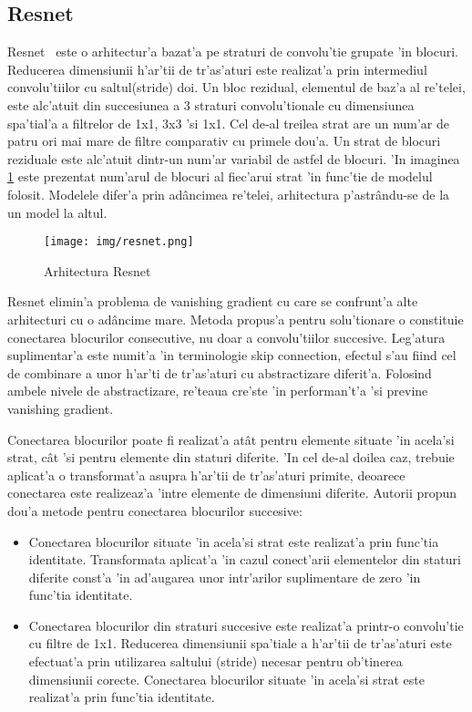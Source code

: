 \documentclass[12pt,a4paper,twoside]{report}
\begin{document}
\subsection{Resnet}

Resnet~\cite{Resnet} este o arhitectur'a bazat'a pe straturi de convolu'tie grupate 'in blocuri. Reducerea dimensiunii h'ar'tii de tr'as'aturi este realizat'a prin intermediul convolu'tiilor cu saltul(stride) doi. Un bloc rezidual, elementul de baz'a al re'telei, este alc'atuit din succesiunea a 3 straturi convolu'tionale cu dimensiunea spa'tial'a a filtrelor de 1x1, 3x3 'si 1x1. Cel de-al treilea strat are un num'ar de patru ori mai mare de filtre comparativ cu primele dou'a. Un strat de blocuri reziduale este alc'atuit dintr-un num'ar variabil de astfel de blocuri. 'In imaginea \ref{fig:resnet} este prezentat num'arul de blocuri al fiec'arui strat 'in func'tie de modelul folosit. Modelele difer'a prin ad\^ancimea re'telei, arhitectura p'astr\^andu-se de la un model la altul.

\begin{figure}[H]
  \texttt{[image: img/resnet.png]}
  \centering
  \caption{Arhitectura Resnet\protect\footnotemark}
  \label{fig:resnet}
\end{figure}

Resnet elimin'a problema de vanishing gradient cu care se confrunt'a alte arhitecturi cu o ad\^ancime mare. Metoda propus'a pentru solu'tionare o constituie conectarea blocurilor consecutive, nu doar a convolu'tiilor succesive. Leg'atura suplimentar'a este numit'a 'in terminologie skip connection, efectul s'au fiind cel de combinare a unor h'ar'ti de tr'as'aturi cu abstractizare diferit'a. Folosind ambele nivele de abstractizare, re'teaua cre'ste 'in performan't'a 'si previne vanishing gradient.
 
Conectarea blocurilor poate fi realizat'a at\^at pentru elemente situate 'in acela'si strat, c\^at 'si pentru elemente din staturi diferite. 'In cel de-al doilea caz, trebuie aplicat'a o transformat'a asupra h'ar'tii de tr'as'aturi primite, deoarece conectarea este realizeaz'a 'intre elemente de dimensiuni diferite. Autorii propun dou'a metode pentru conectarea blocurilor succesive:
\begin{itemize}
\item Conectarea blocurilor situate 'in acela'si strat este realizat'a prin func'tia identitate. Transformata aplicat'a 'in cazul conect'arii elementelor din staturi diferite const'a 'in ad'augarea unor intr'arilor suplimentare de zero 'in func'tia identitate.

\item Conectarea blocurilor din straturi succesive este realizat'a printr-o convolu'tie cu filtre de 1x1. Reducerea dimensiunii spa'tiale a h'ar'tii de tr'as'aturi este efectuat'a prin utilizarea saltului (stride) necesar pentru ob'tinerea dimensiunii corecte. Conectarea blocurilor situate 'in acela'si strat este realizat'a prin func'tia identitate.
\end{itemize} 
\end{document}

